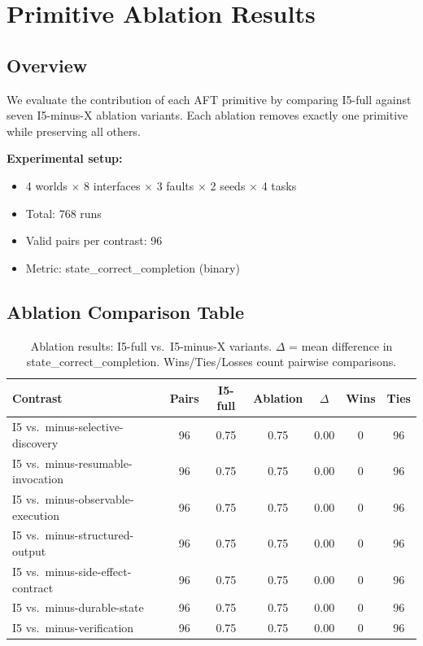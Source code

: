 
\section{Primitive Ablation Results}

\subsection{Overview}
We evaluate the contribution of each AFT primitive by comparing I5-full against seven I5-minus-X ablation variants. Each ablation removes exactly one primitive while preserving all others.

\textbf{Experimental setup:}
\begin{itemize}
    \item 4 worlds $\times$ 8 interfaces $\times$ 3 faults $\times$ 2 seeds $\times$ 4 tasks
    \item Total: 768 runs
    \item Valid pairs per contrast: 96
    \item Metric: state\_correct\_completion (binary)
\end{itemize}

\subsection{Ablation Comparison Table}

\begin{table}[h]
\centering
\begin{tabular}{lcccccc}
\hline
\textbf{Contrast} & \textbf{Pairs} & \textbf{I5-full} & \textbf{Ablation} & \textbf{$\Delta$} & \textbf{Wins} & \textbf{Ties} \\
\hline
I5 vs.\ minus-selective-discovery & 96 & 0.75 & 0.75 & 0.00 & 0 & 96 \\
I5 vs.\ minus-resumable-invocation & 96 & 0.75 & 0.75 & 0.00 & 0 & 96 \\
I5 vs.\ minus-observable-execution & 96 & 0.75 & 0.75 & 0.00 & 0 & 96 \\
I5 vs.\ minus-structured-output & 96 & 0.75 & 0.75 & 0.00 & 0 & 96 \\
I5 vs.\ minus-side-effect-contract & 96 & 0.75 & 0.75 & 0.00 & 0 & 96 \\
I5 vs.\ minus-durable-state & 96 & 0.75 & 0.75 & 0.00 & 0 & 96 \\
I5 vs.\ minus-verification & 96 & 0.75 & 0.75 & 0.00 & 0 & 96 \\
\hline
\end{tabular}
\caption{Ablation results: I5-full vs.\ I5-minus-X variants. $\Delta$ = mean difference in state\_correct\_completion. Wins/Ties/Losses count pairwise comparisons.}
\label{tab:ablation_results}
\end{table}

